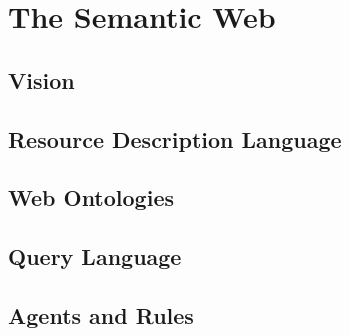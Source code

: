 
\section{The Semantic Web}
\label{sec:semantic_web}

\subsection{Vision}
\label{sec:semantic_vision}


\subsection{Resource Description Language}
\label{sec:semantic_rdl}


\subsection{Web Ontologies}
\label{sec:semantic_ontologies}



\subsection{Query Language}
\label{sec:semantic_querylang}



\subsection{Agents and Rules}
\label{sec:semantic_logic_rules}



